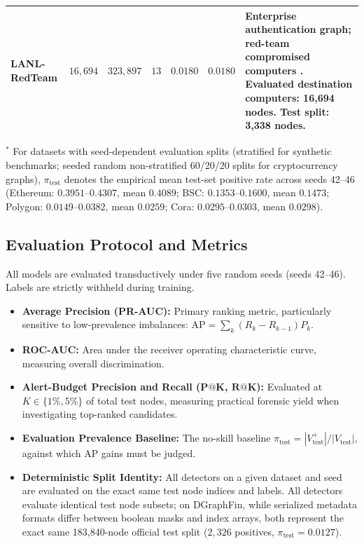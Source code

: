 \documentclass[11pt,a4paper]{article}
\begin{document}
\begin{table}[htbp]
\begin{tabularx}{\textwidth}{lrrrrr>{\raggedright\arraybackslash}X}
LANL-RedTeam & $16,694$ & $323,897$ & $13$ & $0.0180$ & $0.0180$ & Enterprise authentication graph; red-team compromised computers \cite{kent2015cyberdata}. Evaluated destination computers: 16,694 nodes. Test split: 3,338 nodes. \\
\bottomrule
\end{tabularx}
\begin{tablenotes}\footnotesize
\item $^*$ For datasets with seed-dependent evaluation splits (stratified for synthetic benchmarks; seeded random non-stratified 60/20/20 splits for cryptocurrency graphs), $\pi_{\mathrm{test}}$ denotes the empirical mean test-set positive rate across seeds 42--46 (Ethereum: $0.3951$--$0.4307$, mean $0.4089$; BSC: $0.1353$--$0.1600$, mean $0.1473$; Polygon: $0.0149$--$0.0382$, mean $0.0259$; Cora: $0.0295$--$0.0303$, mean $0.0298$).
\end{tablenotes}
\end{table}

\subsection{Evaluation Protocol and Metrics}
All models are evaluated transductively under five random seeds (seeds 42--46). Labels are strictly withheld during training.
\begin{itemize}
    \item \textbf{Average Precision (PR-AUC):} Primary ranking metric, particularly sensitive to low-prevalence imbalances: $\mathrm{AP} = \sum_k (R_k - R_{k-1}) P_k$.
    \item \textbf{ROC-AUC:} Area under the receiver operating characteristic curve, measuring overall discrimination.
    \item \textbf{Alert-Budget Precision and Recall ($\mathbf{P@K}$, $\mathbf{R@K}$):} Evaluated at $K \in \{1\%, 5\%\}$ of total test nodes, measuring practical forensic yield when investigating top-ranked candidates.
    \item \textbf{Evaluation Prevalence Baseline:} The no-skill baseline $\pi_{\mathrm{test}} = |V_{\mathrm{test}}^+| / |V_{\mathrm{test}}|$, against which AP gains must be judged.
    \item \textbf{Deterministic Split Identity:} All detectors on a given dataset and seed are evaluated on the exact same test node indices and labels. All detectors evaluate identical test node subsets; on DGraphFin, while serialized metadata formats differ between boolean masks and index arrays, both represent the exact same 183,840-node official test split ($2{,}326$ positives, $\pi_{\mathrm{test}} = 0.0127$).
\end{itemize}
\end{document}
